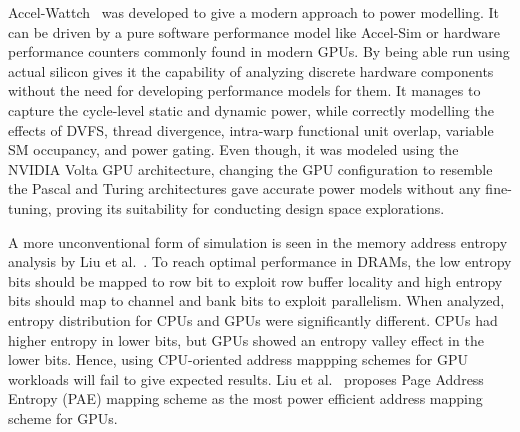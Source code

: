 Accel-Wattch~\cite{Kandiah2021} was developed to give a modern approach to power modelling.
It can be driven by a pure software performance model like Accel-Sim or hardware performance counters commonly found in modern GPUs.
By being able run using actual silicon gives it the capability of analyzing discrete hardware components without the need for developing performance models for them.
It manages to capture the cycle-level static and dynamic power, while correctly modelling the effects of DVFS, thread divergence, intra-warp functional unit overlap, variable SM occupancy, and power gating.
Even though, it was modeled using the NVIDIA Volta GPU architecture, changing the GPU configuration to resemble the Pascal and Turing architectures gave accurate power models without any fine-tuning, proving its suitability for conducting design space explorations.

A more unconventional form of simulation is seen in the memory address entropy analysis by Liu et al.~\cite{Liu2018}.
To reach optimal performance in DRAMs, the low entropy bits should be mapped to row bit to exploit row buffer locality and high entropy bits should map to channel and bank bits to exploit parallelism.
When analyzed, entropy distribution for CPUs and GPUs were significantly different.
CPUs had higher entropy in lower bits, but GPUs showed an entropy valley effect in the lower bits.
Hence, using CPU-oriented address mappping schemes for GPU workloads will fail to give expected results.
Liu et al.~\cite{Liu2018} proposes Page Address Entropy (PAE) mapping scheme as the most power efficient address mapping scheme for GPUs.
